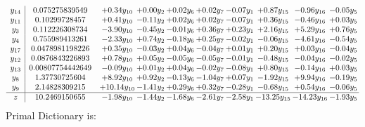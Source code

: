 \documentclass[9pt]{article}
\begin{document}
\[\begin{array}{c| c c@{\hskip 2pt} c@{\hskip 2pt} c@{\hskip 2pt} c@{\hskip 2pt} c@{\hskip 2pt} c@{\hskip 2pt} c@{\hskip 2pt} c@{\hskip 2pt} }
 y_{14}   &  0.075275839549 & +  0.34 y_{10} & +  0.00 y_{2} & +  0.02 y_{6} & +  0.02 y_{7} & -0.07 y_{1} & +  0.87 y_{15} & -0.96 y_{16} & -0.05 y_{5}\\
 y_{11}   &  0.10299728457 & +  0.41 y_{10} & -0.11 y_{2} & +  0.02 y_{6} & +  0.02 y_{7} & -0.07 y_{1} & +  0.36 y_{15} & -0.46 y_{16} & +  0.03 y_{5}\\
 y_{3}   &  0.112226308734 & -3.90 y_{10} & -0.45 y_{2} & -0.01 y_{6} & +  0.36 y_{7} & +  0.23 y_{1} & +  2.16 y_{15} & +  5.29 y_{16} & +  0.76 y_{5}\\
 y_{4}   &  0.755989413261 & -2.33 y_{10} & +  0.74 y_{2} & -0.18 y_{6} & +  0.25 y_{7} & -0.02 y_{1} & -0.06 y_{15} & -4.61 y_{16} & -0.54 y_{5}\\
 y_{17}   &  0.0478981198226 & +  0.35 y_{10} & -0.03 y_{2} & +  0.04 y_{6} & -0.04 y_{7} & +  0.01 y_{1} & +  0.20 y_{15} & +  0.03 y_{16} & -0.04 y_{5}\\
 y_{12}   &  0.0876843226893 & +  0.78 y_{10} & +  0.05 y_{2} & -0.05 y_{6} & -0.05 y_{7} & -0.01 y_{1} & -0.48 y_{15} & -0.04 y_{16} & -0.02 y_{5}\\
 y_{13}   &  0.00807754442649 & -0.09 y_{10} & +  0.01 y_{2} & +  0.04 y_{6} & -0.02 y_{7} & -0.08 y_{1} & +  0.80 y_{15} & -0.14 y_{16} & +  0.03 y_{5}\\
 y_{8}   &  1.37730725604 & +  8.92 y_{10} & +  0.92 y_{2} & -0.13 y_{6} & -1.04 y_{7} & +  0.07 y_{1} & -1.92 y_{15} & +  9.94 y_{16} & -0.19 y_{5}\\
 y_{9}   &  2.14828309215 & + 10.14 y_{10} & -1.41 y_{2} & +  0.29 y_{6} & +  0.32 y_{7} & -0.28 y_{1} & -0.68 y_{15} & +  0.54 y_{16} & -0.06 y_{5}\\
\hline
z    &  10.2469150655 & -1.98 y_{10} & -1.44 y_{2} & -1.68 y_{6} & -2.61 y_{7} & -2.58 y_{1} & -13.25 y_{15} & -14.23 y_{16} & -1.93 y_{5}\\
\end{array}\]
Primal Dictionary is:
\end{document}
